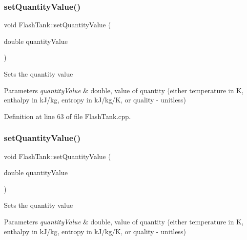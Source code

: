 \subsubsection{\texorpdfstring{set\+Quantity\+Value()}{setQuantityValue()}\hspace{0.1cm}{\footnotesize\ttfamily [1/3]}}
{\footnotesize\ttfamily void Flash\+Tank\+::set\+Quantity\+Value (\begin{DoxyParamCaption}\item[{double}]{quantity\+Value }\end{DoxyParamCaption})}

Sets the quantity value 
\begin{DoxyParams}{Parameters}
{\em quantity\+Value} & double, value of quantity (either temperature in K, enthalpy in k\+J/kg, entropy in k\+J/kg/K, or quality -\/ unitless) \\
\hline
\end{DoxyParams}


Definition at line 63 of file Flash\+Tank.\+cpp.

\mbox{\label{class_flash_tank_ac7392743aeaf8de6ce368814ea42e236}} 
\subsubsection{\texorpdfstring{set\+Quantity\+Value()}{setQuantityValue()}\hspace{0.1cm}{\footnotesize\ttfamily [2/3]}}
{\footnotesize\ttfamily void Flash\+Tank\+::set\+Quantity\+Value (\begin{DoxyParamCaption}\item[{double}]{quantity\+Value }\end{DoxyParamCaption})}

Sets the quantity value 
\begin{DoxyParams}{Parameters}
{\em quantity\+Value} & double, value of quantity (either temperature in K, enthalpy in k\+J/kg, entropy in k\+J/kg/K, or quality -\/ unitless) \\
\hline
\end{DoxyParams}
\mbox{\label{class_flash_tank_ac7392743aeaf8de6ce368814ea42e236}} 
